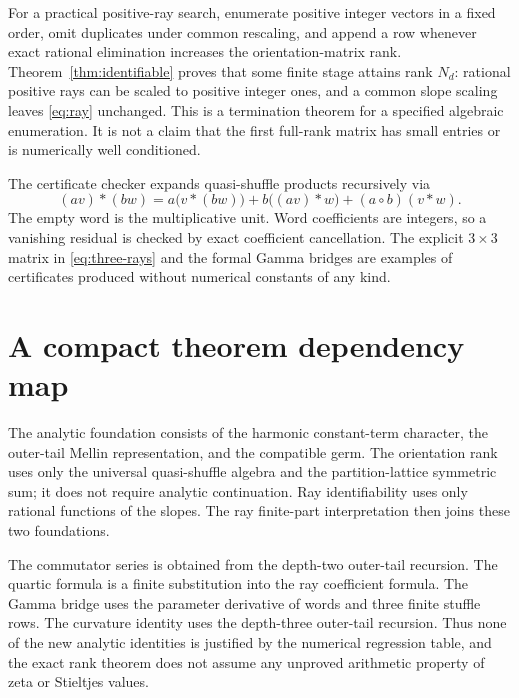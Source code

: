 \documentclass[11pt]{article}
\numberwithin{equation}{section}
\theoremstyle{definition}
\begin{document}
For a practical positive-ray search, enumerate positive integer vectors
in a fixed order, omit duplicates under common rescaling, and append a
row whenever exact rational elimination increases the orientation-matrix
rank. Theorem~\ref{thm:identifiable} proves that some finite stage attains
rank $N_d$: rational positive rays can be scaled to positive integer ones,
and a common slope scaling leaves \eqref{eq:ray} unchanged. This is a
termination theorem for a specified algebraic enumeration. It is not a
claim that the first full-rank matrix has small entries or is numerically
well conditioned.

The certificate checker expands quasi-shuffle products recursively via
\[
 (av)*(bw)=a\bigl(v*(bw)\bigr)+b\bigl((av)*w\bigr)
                  +(a\circ b)(v*w).
\]
The empty word is the multiplicative unit. Word coefficients are integers,
so a vanishing residual is checked by exact coefficient cancellation.
The explicit $3\times3$ matrix in \eqref{eq:three-rays} and the formal
Gamma bridges are examples of certificates produced without numerical
constants of any kind.

\section{A compact theorem dependency map}
\label{app:dependencies}
The analytic foundation consists of the harmonic constant-term character,
the outer-tail Mellin representation, and the compatible germ. The
orientation rank uses only the universal quasi-shuffle algebra and the
partition-lattice symmetric sum; it does not require analytic continuation.
Ray identifiability uses only rational functions of the slopes. The ray
finite-part interpretation then joins these two foundations.

The commutator series is obtained from the depth-two outer-tail recursion.
The quartic formula is a finite substitution into the ray coefficient
formula. The Gamma bridge uses the parameter derivative of words and
three finite stuffle rows. The curvature identity uses the depth-three
outer-tail recursion. Thus none of the new analytic identities is justified
by the numerical regression table, and the exact rank theorem does not
assume any unproved arithmetic property of zeta or Stieltjes values.
\end{document}
